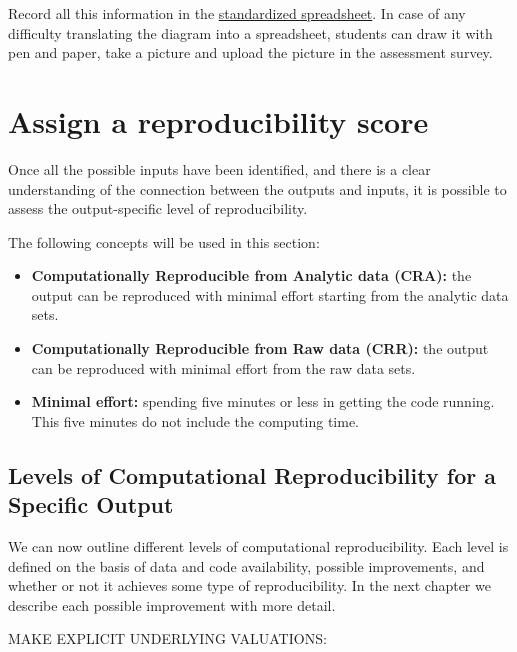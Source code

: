 \documentclass[]{book}
\begin{document}
Record all this information in the \href{https://docs.google.com/spreadsheets/d/1LUIdVFH0OfR70C7z07TYeE-uWzKI_JIeWUMaYhqEKK0/edit\#gid=1384504774\&range=A1}{standardized spreadsheet}.
In case of any difficulty translating the diagram into a spreadsheet, students can draw it with pen and paper, take a picture and upload the picture in the assessment survey.

\hypertarget{score}{%
\section{Assign a reproducibility score}\label{score}}

Once all the possible inputs have been identified, and there is a clear understanding of the connection between the outputs and inputs, it is possible to assess the output-specific level of reproducibility.

The following concepts will be used in this section:

\begin{itemize}
\item
  \textbf{Computationally Reproducible from Analytic data (CRA):} the output can be reproduced with minimal effort starting from the analytic data sets.
\item
  \textbf{Computationally Reproducible from Raw data (CRR):} the output can be reproduced with minimal effort from the raw data sets.
\item
  \textbf{Minimal effort:} spending five minutes or less in getting the code running. This five minutes do not include the computing time.
\end{itemize}

\hypertarget{levels-of-computational-reproducibility-for-a-specific-output}{%
\subsection{Levels of Computational Reproducibility for a Specific Output}\label{levels-of-computational-reproducibility-for-a-specific-output}}

We can now outline different levels of computational reproducibility. Each level is defined on the basis of data and code availability, possible improvements, and whether or not it achieves some type of reproducibility. In the next chapter we describe each possible improvement with more detail.

MAKE EXPLICIT UNDERLYING VALUATIONS:
\end{document}
